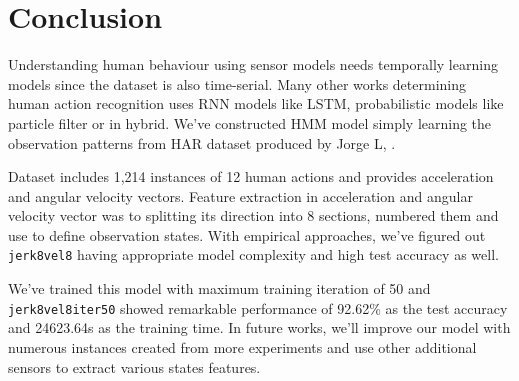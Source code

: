 \documentclass[10pt,twocolumn,letterpaper]{article}
\begin{document}
\section{Conclusion}
Understanding human behaviour using sensor models needs temporally learning models since the dataset is also time-serial. Many other works determining human action recognition uses RNN models like LSTM, probabilistic models like particle filter or in hybrid. We've constructed HMM model simply learning the observation patterns from HAR dataset produced by Jorge L, \etal.

Dataset includes 1,214 instances of 12 human actions and provides acceleration and angular velocity vectors. Feature extraction in acceleration and angular velocity vector was to splitting its direction into 8 sections, numbered them and use to define observation states. With empirical approaches, we've figured out \texttt{jerk8vel8} having appropriate model complexity and high test accuracy as well.

We've trained this model with maximum training iteration of 50 and \texttt{jerk8vel8iter50} showed remarkable performance of 92.62\% as the test accuracy and 24623.64s as the training time. In future works, we'll improve our model with numerous instances created from more experiments and use other additional sensors to extract various states features.
\end{document}
